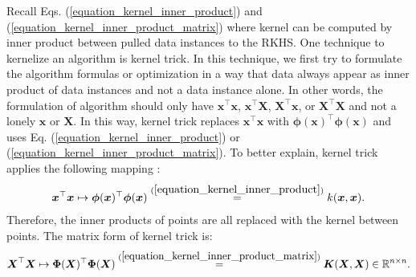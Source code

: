 \documentclass[lang=cn,10pt]{gorgeousnbook}
\numberwithin{equation}{section}%
\numberwithin{figure}{section}%
\begin{document}
Recall Eqs. (\ref{equation_kernel_inner_product}) and (\ref{equation_kernel_inner_product_matrix}) where kernel can be computed by inner product between pulled data instances to the RKHS. 
One technique to kernelize an algorithm is kernel trick. In this technique, we first try to formulate the algorithm formulas or optimization in a way that data always appear as inner product of data instances and not a data instance alone. In other words, the formulation of algorithm should only have $\boldsymbol{x}^\top \boldsymbol{x}$, $\boldsymbol{x}^\top \boldsymbol{X}$, $\boldsymbol{X}^\top \boldsymbol{x}$, or $\boldsymbol{X}^\top \boldsymbol{X}$ and not a lonely $\boldsymbol{x}$ or $\boldsymbol{X}$. In this way, kernel trick replaces $\boldsymbol{x}^\top \boldsymbol{x}$ with $\boldsymbol{\phi}(\boldsymbol{x})^\top \boldsymbol{\phi}(\boldsymbol{x})$ and uses Eq. (\ref{equation_kernel_inner_product}) or (\ref{equation_kernel_inner_product_matrix}). To better explain, kernel trick applies the following mapping \cite{burges1998tutorial}:
\begin{align}\label{equation_kernel_trick}
\boldsymbol{x}^\top \boldsymbol{x} \mapsto \boldsymbol{\phi}(\boldsymbol{x})^\top \boldsymbol{\phi}(\boldsymbol{x}) \overset{(\ref{equation_kernel_inner_product})}{=} k(\boldsymbol{x}, \boldsymbol{x}).
\end{align}
Therefore, the inner products of points are all replaced with the kernel between points. The matrix form of kernel trick is:
\begin{align}\label{equation_kernel_trick_matrix}
\boldsymbol{X}^\top \boldsymbol{X} \mapsto \boldsymbol{\Phi}(\boldsymbol{X})^\top \boldsymbol{\Phi}(\boldsymbol{X}) \overset{(\ref{equation_kernel_inner_product_matrix})}{=} \boldsymbol{K}(\boldsymbol{X}, \boldsymbol{X}) \in \mathbb{R}^{n \times n}.
\end{align}
\end{document}

